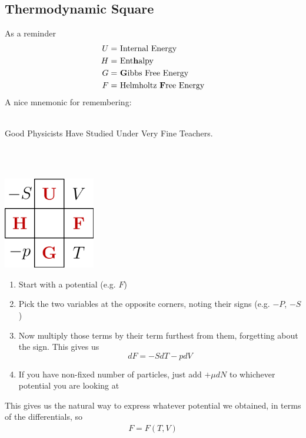 \subsection{Thermodynamic Square}\label{square}

As a reminder
\begin{align}
U=&~\textrm{Internal Energy}\\
H =&~\textrm{Ent\textbf{h}alpy}\\
G =&~\textrm{\textbf{G}ibbs Free Energy}\\
F =&~\textrm{Helmholtz \textbf{F}ree Energy}
\end{align}
A nice mnemonic for remembering:\\ \\
\centerline{Good Physicists Have Studied Under Very Fine Teachers.}
\\
\\
\centerline{\includegraphics[width=0.3\textwidth]{physics/images/Thermodynamic_square}}
\begin{enumerate}
\item Start with a potential (e.g. $F$)
\item Pick the two variables at the opposite corners, noting their signs (e.g. $-P$, $-S$)
\item Now multiply those terms by their term furthest from them, forgetting about the sign. This gives us $$dF = -S dT -pdV$$
\item If you have non-fixed number of particles, just add $+\mu dN$ to whichever potential you are looking at
\end{enumerate}

This gives us the natural way to express whatever potential we obtained, in terms of the differentials, so
\begin{align}
F = F(T,V)
\end{align}


